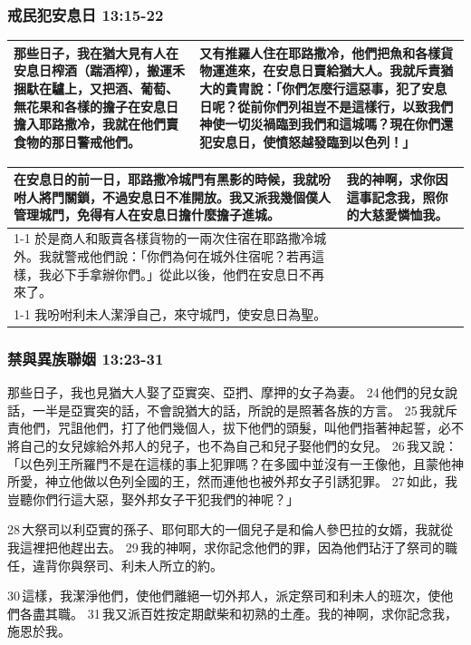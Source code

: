 \subsubsection{戒民犯安息日 13:15-22}
\begin{table}[H]
  \centering
    \begin{tabular}{p{}|p{}}    \toprule
那些日子，我在猶大見有人在安息日榨酒（踹酒榨），搬運禾捆馱在驢上，又把酒、葡萄、無花果和各樣的擔子在安息日擔入耶路撒冷，我就在他們賣食物的那日警戒他們。 
&又有推羅人住在耶路撒冷，他們把魚和各樣貨物運進來，在安息日賣給猶大人。我就斥責猶大的貴胄說：「你們怎麼行這惡事，犯了安息日呢？從前你們列祖豈不是這樣行，以致我們神使一切災禍臨到我們和這城嗎？現在你們還犯安息日，使憤怒越發臨到以色列！」\\   \bottomrule
    \end{tabular}%
\end{table}%


\begin{table}[H]
  \centering
    \begin{tabular}{p{}|p{}}    \toprule
在安息日的前一日，耶路撒冷城門有黑影的時候，我就吩咐人將門關鎖，不過安息日不准開放。我又派我幾個僕人管理城門，免得有人在安息日擔什麼擔子進城。 
&\multirow{3}{5.1em}{我的神啊，求你因這事記念我，照你的大慈愛憐恤我。}\\\cline{1-1}
於是商人和販賣各樣貨物的一兩次住宿在耶路撒冷城外。我就警戒他們說：「你們為何在城外住宿呢？若再這樣，我必下手拿辦你們。」從此以後，他們在安息日不再來了。&\\\cline{1-1}
我吩咐利未人潔淨自己，來守城門，使安息日為聖。&\\   \bottomrule
\end{tabular}%
\end{table}%

\subsubsection{禁與異族聯姻 13:23-31}
那些日子，我也見猶大人娶了亞實突、亞捫、摩押的女子為妻。 24 他們的兒女說話，一半是亞實突的話，不會說猶大的話，所說的是照著各族的方言。 25 我就斥責他們，咒詛他們，打了他們幾個人，拔下他們的頭髮，叫他們指著神起誓，必不將自己的女兒嫁給外邦人的兒子，也不為自己和兒子娶他們的女兒。 26 我又說：「以色列王所羅門不是在這樣的事上犯罪嗎？在多國中並沒有一王像他，且蒙他神所愛，神立他做以色列全國的王，然而連他也被外邦女子引誘犯罪。 27 如此，我豈聽你們行這大惡，娶外邦女子干犯我們的神呢？」

28 大祭司以利亞實的孫子、耶何耶大的一個兒子是和倫人參巴拉的女婿，我就從我這裡把他趕出去。 29 我的神啊，求你記念他們的罪，因為他們玷汙了祭司的職任，違背你與祭司、利未人所立的約。

30 這樣，我潔淨他們，使他們離絕一切外邦人，派定祭司和利未人的班次，使他們各盡其職。 31 我又派百姓按定期獻柴和初熟的土產。我的神啊，求你記念我，施恩於我。











